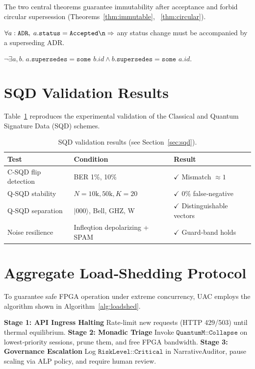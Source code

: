 The two central theorems guarantee immutability after acceptance
and forbid circular supersession (Theorems~\ref{thm:immutable},
~\ref{thm:circular}).

\begin{theorem}\label{thm:immutable}
\(\forall a:\texttt{ADR},\; a.\texttt{status}= \texttt{Accepted}\n\Rightarrow\) any status change must be accompanied by a superseding ADR.
\end{theorem}

\begin{theorem}\label{thm:circular}
\(\neg\exists a,b.\; a.\texttt{supersedes}= \texttt{some }b.id
\land b.\texttt{supersedes}= \texttt{some }a.id\).
\end{theorem}

\section{SQD Validation Results}
\label{sec:sqd-validation}
Table~\ref{tab:sqd-validation} reproduces the experimental validation of the
Classical and Quantum Signature Data (SQD) schemes.

\begin{table}[h]
\centering
\begin{tabular}{lll}
\toprule
\textbf{Test} & \textbf{Condition} & \textbf{Result} \\
\midrule
C‑SQD flip detection   & BER 1\%, 10\%               & $\checkmark$ Mismatch $\approx 1$ \\
Q‑SQD stability        & $N=10\text{k},50\text{k},K=20$ & $\checkmark$ 0\% false‑negative \\
Q‑SQD separation       & $|000\rangle$, Bell, GHZ, W   & $\checkmark$ Distinguishable vectors \\
Noise resilience       & Infleqtion depolarizing + SPAM & $\checkmark$ Guard‑band holds \\
\bottomrule
\end{tabular}
\caption{SQD validation results (see Section~\ref{sec:sqd}).}
\label{tab:sqd-validation}
\end{table}

\section{Aggregate Load‑Shedding Protocol}
\label{sec:load-shedding}
To guarantee safe FPGA operation under extreme concurrency, UAC employs the
algorithm shown in Algorithm~\ref{alg:loadshed}.

\begin{algorithm}
\caption{Aggregate Load Shedding Protocol}
\label{alg:loadshed}
\begin{algorithmic}[1]
\State \textbf{Stage 1: API Ingress Halting}
\State Rate‑limit new requests (HTTP 429/503) until thermal equilibrium.
\State \textbf{Stage 2: Monadic Triage}
\State Invoke $\texttt{QuantumM::Collapse}$ on lowest‑priority sessions,
      prune them, and free FPGA bandwidth.
\State \textbf{Stage 3: Governance Escalation}
\State Log $\texttt{RiskLevel::Critical}$ in NarrativeAuditor,
      pause scaling via ALP policy, and require human review.
\end{algorithmic}
\end{algorithm}
